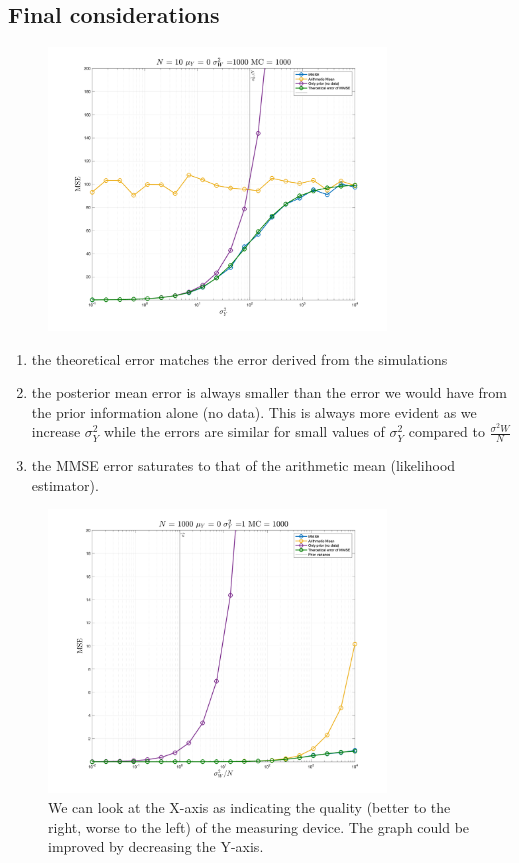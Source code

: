 \subsection*{Final considerations}
\begin{figure}[H]
    \centering
    \includegraphics[width=0.8\textwidth]{./figures/appendix_a/figure_21.png}
\end{figure}

\begin{enumerate}
    \item the theoretical error matches the error derived from the simulations
    \item the posterior mean error is always smaller than the error we would have from the prior information alone (no data). This is always more evident as we increase $\sigma^2_Y$ while the errors are similar for small values of $\sigma^2_Y$ compared to $\frac{\sigma^2 W}{N}$
    \item the MMSE error saturates to that of the arithmetic mean (likelihood estimator).
\end{enumerate}

\begin{figure}[H]
    \centering
    \includegraphics[width=0.8\textwidth]{./figures/appendix_a/figure_22.png}
    \caption{We can look at the X-axis as indicating the quality (better to the right, worse to the left) of the measuring device. The graph could be improved by decreasing the Y-axis.}
\end{figure}

